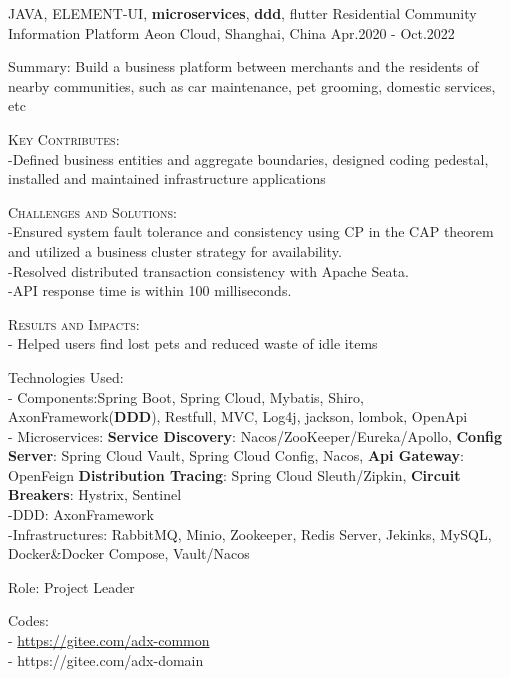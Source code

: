 

\begin{cventries}
  \cventry
    {JAVA, ELEMENT-UI, \textbf{microservices}, \textbf{ddd}, flutter} %
    {Residential Community Information  Platform} %
    {Aeon Cloud, Shanghai, China} %
    {Apr.2020 - Oct.2022} %
    {
      \begin{cvitems} %
        \item {Summary: Build a business platform between merchants and the residents of nearby communities, such as car maintenance, pet grooming, domestic services, etc}
        \item { \textsc{Key Contributes}:\\-Defined business entities and aggregate boundaries, designed coding pedestal, installed and maintained infrastructure applications  }
        \item { \textsc{Challenges and Solutions}: \\-Ensured system fault tolerance and consistency using CP in the CAP theorem and utilized a business cluster strategy for availability. \\-Resolved distributed transaction consistency with Apache Seata. \\-API response time is within 100 milliseconds.}
        \item {\textsc{Results and Impacts}: \\- Helped users find lost pets and reduced waste of idle items  }
        \item {Technologies Used: \\- Components:Spring Boot, Spring Cloud, Mybatis, Shiro, AxonFramework(\textbf{DDD}), Restfull, MVC, Log4j, jackson, lombok, OpenApi \\- {Microservices: \textbf{Service Discovery}: { Nacos/ZooKeeper/Eureka/Apollo,} \textbf{Config Server}: Spring Cloud Vault, Spring Cloud Config, Nacos,  \textbf{Api Gateway}: OpenFeign  \textbf{Distribution Tracing}: Spring Cloud Sleuth/Zipkin, \textbf{Circuit Breakers}: Hystrix, Sentinel} \\-DDD: AxonFramework  \\-Infrastructures: RabbitMQ, Minio, Zookeeper, Redis Server, Jekinks, MySQL, Docker\&Docker Compose, Vault/Nacos }
        \item {Role: Project Leader}  
        \item {Codes: \\- \hyperlink{https://gitee.com/adx-common}{https://gitee.com/adx-common}  \\- https://gitee.com/adx-domain}
      \end{cvitems}
    }


\end{cventries}
